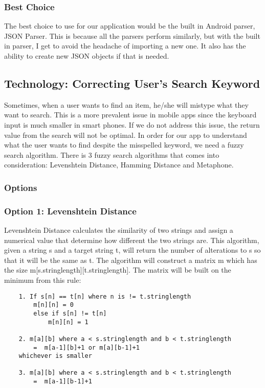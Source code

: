 \documentclass[journal,compsoc, 10pt, draftclsnofoot, onecolumn]{IEEEtran}
\begin{document}
\subsubsection{Best Choice}
The best choice to use for our application would be the built in Android parser,
JSON Parser. This is because all the parsers perform similarly, but with the
built in parser, I get to avoid the headache of importing a new one. It also has
the ability to create new JSON objects if that is needed.

\subsection{Technology: Correcting User's Search Keyword}
Sometimes, when a user wants to find an item, he/she will mistype what they want to search. This is a more prevalent issue in mobile apps since the keyboard input is much smaller in smart phones. If we do not address this issue, the return value from the search will not be optimal. In order for our app to understand what the user wants to find despite the misspelled keyword, we need a fuzzy search algorithm. 
There is 3 fuzzy search algorithms that comes into consideration: Levenshtein Distance, Hamming Distance and Metaphone.

\subsubsection{Options}
\subsubsection*{Option 1: Levenshtein Distance}
Levenshtein Distance calculates the similarity of two strings and assign a numerical value that determine how different the two strings are. This algorithm, given a string s and a target string t, will return the number of alterations to s so that it will be the same as t. The algorithm will construct a matrix m which has the size m[s.stringlength][t.stringlength]. The matrix will be built on the minimum from this rule:

\begin{lstlisting}
	1. If s[n] == t[n] where n is != t.stringlength 
		m[n][n] = 0 
		else if s[n] != t[n] 
			m[n][n] = 1
	
	2. m[a][b] where a < s.stringlength and b < t.stringlength 
		=  m[a-1][b]+1 or m[a][b-1]+1 
	whichever is smaller
	
	3. m[a][b] where a < s.stringlength and b < t.stringlength 
		=  m[a-1][b-1]+1
\end{lstlisting}
\end{document}
